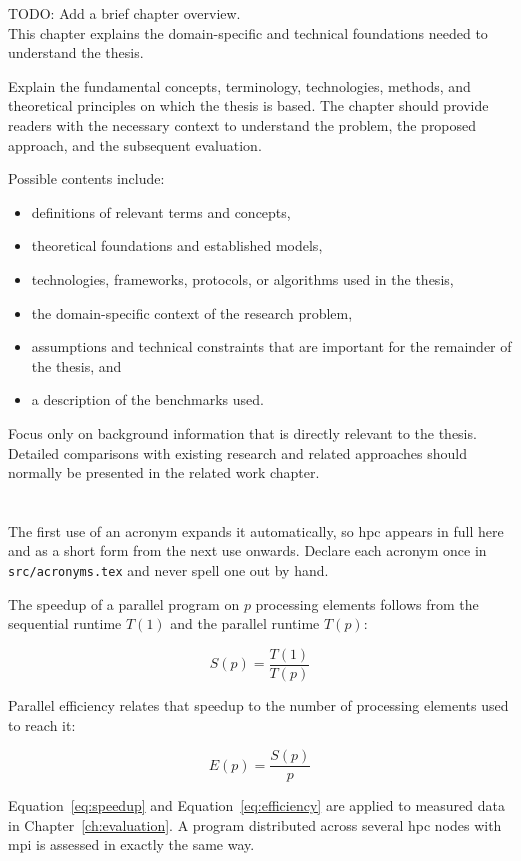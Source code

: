   {TODO: Add a brief chapter overview. \\
  This chapter explains the domain-specific and technical foundations needed to understand the thesis.}

%
Explain the fundamental concepts, terminology, technologies, methods, and theoretical principles on which the thesis is based.
The chapter should provide readers with the necessary context to understand the problem, the proposed approach, and the subsequent evaluation.

Possible contents include:
\begin{itemize}
  \item definitions of relevant terms and concepts,
  \item theoretical foundations and established models,
  \item technologies, frameworks, protocols, or algorithms used in the thesis,
  \item the domain-specific context of the research problem,
  \item assumptions and technical constraints that are important for the remainder of the thesis, and
  \item a description of the benchmarks used.
\end{itemize}

Focus only on background information that is directly relevant to the thesis.
Detailed comparisons with existing research and related approaches should normally be presented in the related work chapter.

\section{}
\label{sec:example-definitions}

The first use of an acronym expands it automatically, so \ac{hpc} appears in full here and as a short form from the next use onwards.
Declare each acronym once in \texttt{src/acronyms.tex} and never spell one out by hand.

The speedup of a parallel program on $p$ processing elements follows from the sequential runtime $T(1)$ and the parallel runtime $T(p)$:

\begin{equation}
  \label{eq:speedup}
  S(p) = \frac{T(1)}{T(p)}
\end{equation}

Parallel efficiency relates that speedup to the number of processing elements used to reach it:

\begin{equation}
  \label{eq:efficiency}
  E(p) = \frac{S(p)}{p}
\end{equation}

Equation~\eqref{eq:speedup} and Equation~\eqref{eq:efficiency} are applied to measured data in Chapter~\ref{ch:evaluation}.
A program distributed across several \ac{hpc} nodes with \ac{mpi} is assessed in exactly the same way.
